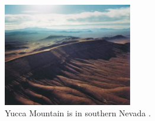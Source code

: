 \begin{figure}[htbp!]
  \begin{center}
    \includegraphics[width=0.5\textwidth]{./images/yucca_site.eps}
  \end{center}
  \caption{Yucca Mountain is in southern Nevada \cite{omb_yucca_2006}.}
  \label{fig:yucca_site}
\end{figure}
